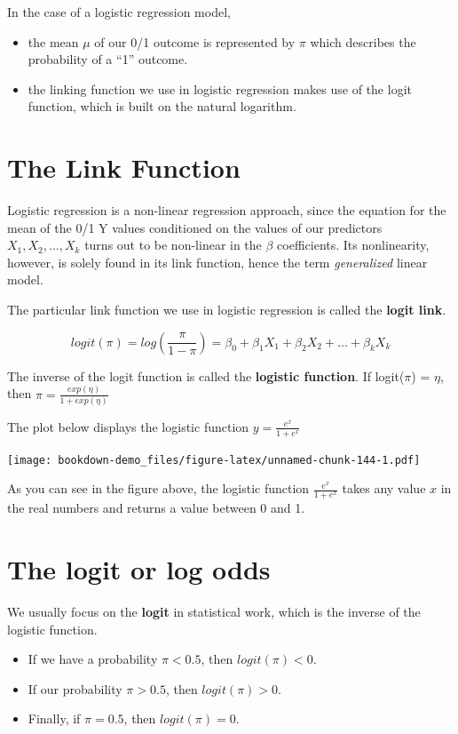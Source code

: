 \documentclass[]{book}
\providecommand{\tightlist}{%
  \setlength{\itemsep}{0pt}\setlength{\parskip}{0pt}}
\theoremstyle{definition}
\theoremstyle{definition}
\theoremstyle{definition}
\theoremstyle{remark}
\begin{document}
In the case of a logistic regression model,

\begin{itemize}
\tightlist
\item
  the mean \(\mu\) of our 0/1 outcome is represented by \(\pi\) which
  describes the probability of a ``1'' outcome.
\item
  the linking function we use in logistic regression makes use of the
  logit function, which is built on the natural logarithm.
\end{itemize}

\section{The Link Function}\label{the-link-function}

Logistic regression is a non-linear regression approach, since the
equation for the mean of the 0/1 Y values conditioned on the values of
our predictors \(X_1, X_2, ..., X_k\) turns out to be non-linear in the
\(\beta\) coefficients. Its nonlinearity, however, is solely found in
its link function, hence the term \emph{generalized} linear model.

The particular link function we use in logistic regression is called the
\textbf{logit link}.

\[
logit(\pi) = log\left( \frac{\pi}{1 - \pi} \right) = \beta_0 + \beta_1 X_1 + \beta_2 X_2 + ... + \beta_k X_k
\]

The inverse of the logit function is called the \textbf{logistic
function}. If logit(\(\pi\)) = \(\eta\), then
\(\pi = \frac{exp(\eta)}{1 + exp(\eta)}\)

The plot below displays the logistic function
\(y = \frac{e^x}{1 + e^x}\)

\texttt{[image: bookdown-demo\_files/figure-latex/unnamed-chunk-144-1.pdf]}

As you can see in the figure above, the logistic function
\(\frac{e^x}{1 + e^x}\) takes any value \(x\) in the real numbers and
returns a value between 0 and 1.

\section{The logit or log odds}\label{the-logit-or-log-odds}

We usually focus on the \textbf{logit} in statistical work, which is the
inverse of the logistic function.

\begin{itemize}
\tightlist
\item
  If we have a probability \(\pi < 0.5\), then \(logit(\pi) < 0\).
\item
  If our probability \(\pi > 0.5\), then \(logit(\pi) > 0\).
\item
  Finally, if \(\pi = 0.5\), then \(logit(\pi) = 0\).
\end{itemize}
\end{document}
